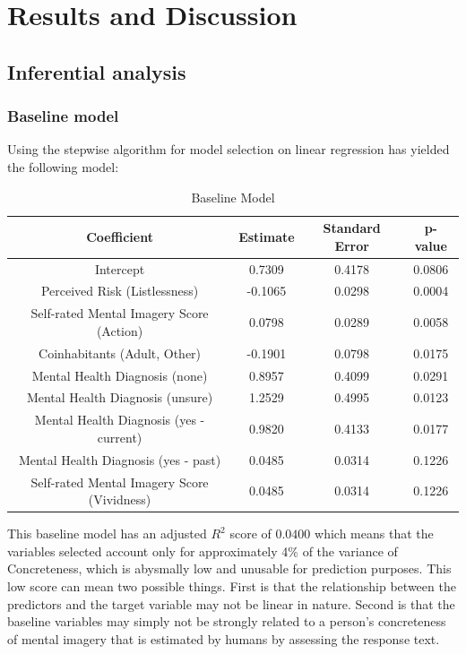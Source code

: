 \documentclass[12pt, a4paper]{article}
\begin{document}
\section{Results and Discussion}

\subsection{Inferential analysis}

\subsubsection{Baseline model}
Using the stepwise algorithm for model selection on linear regression has yielded the following model:

\begin{table}[ht]
\centering
\begin{tabular}{||c c c c||} 
 \hline
 Coefficient & Estimate & Standard Error & p-value \\ [0.5ex] 
 \hline\hline
 Intercept & 0.7309 & 0.4178 & 0.0806 \\ 
 Perceived Risk (Listlessness) & -0.1065 & 0.0298 & 0.0004 \\
 Self-rated Mental Imagery Score (Action)  & 0.0798 & 0.0289 & 0.0058 \\
 Coinhabitants (Adult, Other)\footnotemark & -0.1901 & 0.0798 & 0.0175 \\
 Mental Health Diagnosis (none) & 0.8957 & 0.4099 & 0.0291 \\ 
Mental Health Diagnosis (unsure) & 1.2529 & 0.4995 & 0.0123 \\
Mental Health Diagnosis (yes - current) & 0.9820 & 0.4133 & 0.0177 \\
Mental Health Diagnosis (yes - past) & 0.0485 & 0.0314 & 0.1226\\
 Self-rated Mental Imagery Score (Vividness)  & 0.0485 & 0.0314 & 0.1226 \\ [1ex] 
 \hline
\end{tabular}
\caption{Baseline Model}
\label{table:1}
\end{table}

This baseline model has an adjusted $R^2$ score of $0.0400$ which means that the variables selected account only for approximately 4\% of the variance of Concreteness, which is abysmally low and unusable for prediction purposes. This low score can  mean two possible things. First is that the relationship between the predictors and the target variable may not be linear in nature. Second is that the baseline variables may simply not be strongly related to a person's concreteness of mental imagery that is estimated by humans by assessing the response text.  
\end{document}
